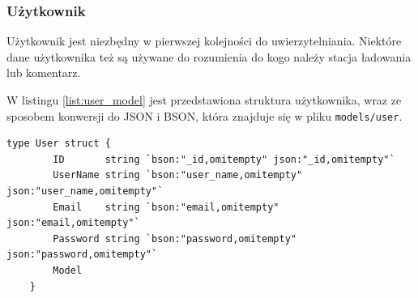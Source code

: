\subsubsection{Użytkownik}
Użytkownik jest niezbędny w pierwszej kolejności do uwierzytelniania. Niektóre dane użytkownika też są używane do rozumienia do kogo należy stacja ładowania lub komentarz.

W listingu \ref{list:user_model} jest przedstawiona struktura użytkownika, wraz ze sposobem konwersji do JSON i BSON, która znajduje się w pliku \texttt{models/user}.
\begin{lstlisting}[label=list:user_model,caption=Model danych użytkownika.,basicstyle=\tiny\ttfamily]
    type User struct {
        ID       string `bson:"_id,omitempty" json:"_id,omitempty"`
        UserName string `bson:"user_name,omitempty" json:"user_name,omitempty"`
        Email    string `bson:"email,omitempty" json:"email,omitempty"`
        Password string `bson:"password,omitempty" json:"password,omitempty"`
        Model
    }
\end{lstlisting}

% 


